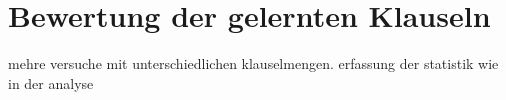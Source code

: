 \chapter{Bewertung der gelernten Klauseln}
\label{chp:bewertung}

mehre versuche mit unterschiedlichen klauselmengen.
erfassung der statistik wie in der analyse






